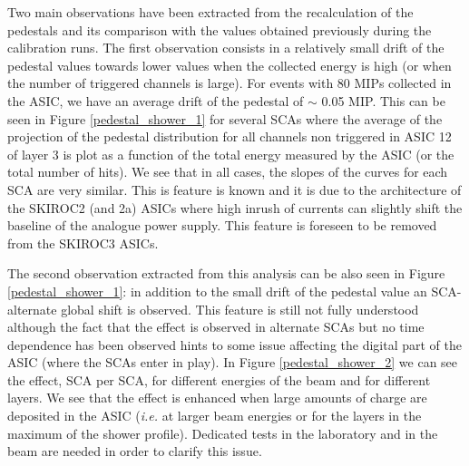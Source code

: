 \documentclass[a4paper,11pt]{article}
\begin{document}
Two main observations have been extracted from the recalculation of the pedestals and its comparison
with the values obtained previously during the calibration runs. The first observation
consists in a relatively small 
drift of the pedestal values
towards lower values when the collected energy is high (or when the number of triggered channels is large).
For events with 80 MIPs collected in the ASIC, we have an average drift of the pedestal of $\sim$ 0.05 MIP. 
This can be seen in Figure \ref{pedestal_shower_1} for several SCAs where the
average of the projection of the pedestal distribution for all channels non triggered in ASIC 12 of layer 3 
is plot as a function of the total energy measured by the ASIC (or the total number of hits).
We see that in all cases, the slopes of the curves 
for each SCA are very similar.
This is feature is known and it is due to the architecture of the SKIROC2 (and 2a) ASICs 
where high inrush of currents can slightly shift the baseline of the analogue power supply. 
This feature is foreseen to be removed from the SKIROC3 ASICs. 

The second observation extracted from this analysis can be also seen in Figure \ref{pedestal_shower_1}: in addition
to the small drift of the pedestal value an SCA-alternate global shift
is observed. This feature is still not fully understood although the fact that the effect is observed in
alternate SCAs but no time dependence has been observed hints to some issue affecting the digital part of the ASIC 
(where the SCAs enter in play). 
In Figure \ref{pedestal_shower_2} we can see the effect, SCA per SCA, for different energies of the beam
and for different layers. We see that the effect is enhanced when large amounts of charge
are deposited in the ASIC ({\it i.e.} at larger beam energies or for the layers in the maximum of the shower
profile).
Dedicated tests in the laboratory and in the beam are needed in order to clarify this issue.
\end{document}
